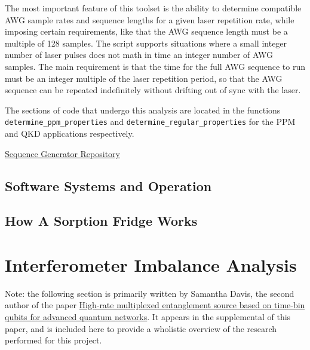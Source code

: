 \documentclass[11pt]{caltech_thesis} %
\begin{document}
The most important feature of this toolset is the ability to determine compatible AWG sample rates and sequence lengths for a given laser repetition rate, while imposing certain requirements, like that the AWG sequence length must be a multiple of 128 samples. The script supports situations where a small integer number of laser pulses does not math in time an integer number of AWG samples. The main requirement is that the time for the full AWG sequence to run must be an integer multiple of the laser repetition period, so that the AWG sequence can be repeated indefinitely without drifting out of sync with the laser.

The sections of code that undergo this analysis are located in the functions \texttt{determine\_ppm\_properties} and \texttt{determine\_regular\_properties} for the PPM and QKD applications respectively.

\href{https://github.com/sansseriff/sequence_generator/tree/main}{Sequence Generator Repository}

\hypertarget{section}{%
\section{}\label{section}}

\hypertarget{software-systems-and-operation}{%
\section{Software Systems and Operation}\label{software-systems-and-operation}}

\hypertarget{how-a-sorption-fridge-works}{%
\section{How A Sorption Fridge Works}\label{how-a-sorption-fridge-works}}

\hypertarget{interferometer-imbalance-analysis-1}{%
\chapter{Interferometer Imbalance Analysis}\label{interferometer-imbalance-analysis-1}}

Note: the following section is primarily written by Samantha Davis, the second author of the paper \href{https://arxiv.org/abs/2310.01804}{High-rate multiplexed entanglement source based on time-bin qubits for advanced quantum networks}. It appears in the supplemental of this paper, and is included here to provide a wholistic overview of the research performed for this project.
\end{document}
